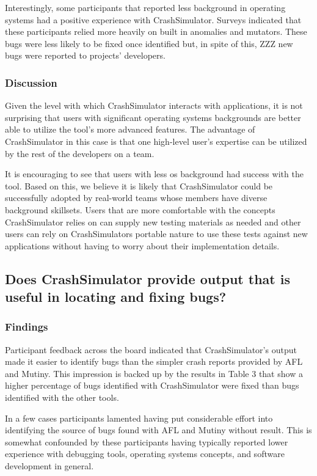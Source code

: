 Interestingly, some participants that reported less background in operating
systems had a positive experience with CrashSimulator.  Surveys indicated
that these participants relied more heavily on built in
anomalies and mutators.  These bugs were less likely to be fixed once
identified but, in spite of this, ZZZ new bugs were reported to projects'
developers.


\subsubsection{Discussion}

Given the level with which CrashSimulator interacts with applications, it
is not surprising that users with significant operating systems backgrounds
are better able to utilize the tool's more advanced features.  The
advantage of CrashSimulator in this case is that one high-level user's
expertise can be utilized by the rest of the developers on a team.

It is encouraging to see that users with less os background had success
with the tool.  Based on this, we believe it is likely that CrashSimulator
could be successfully adopted by real-world teams whose members have
diverse background skillsets.  Users that are more comfortable with the
concepts CrashSimulator relies on can supply new testing materials as
needed and other users can rely on CrashSimulators portable nature to use
these tests against new applications without having to worry about their
implementation details.


\subsection{Does CrashSimulator provide output that is useful in locating
and fixing bugs?}


\subsubsection{Findings}

Participant feedback across the board indicated that CrashSimulator's
output made it easier to identify bugs than the simpler crash reports
provided by AFL and Mutiny.  This impression is backed up by the results in
Table 3 that show a higher percentage of bugs identified with
CrashSimulator were fixed than bugs identified with the other tools.

In a few cases participants lamented having put considerable effort into
identifying the source of bugs found with AFL and Mutiny without result.
This is somewhat confounded by these participants having typically reported
lower experience with debugging tools, operating systems concepts, and
software development in general.



